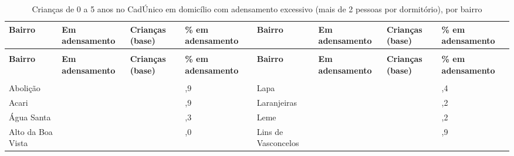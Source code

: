 \begin{apendicesenv}
{\renewcommand{\arraystretch}{1.0}
{\footnotesize\setlength{\tabcolsep}{3.5pt}
\begin{longtable}{@{}>{\raggedright\arraybackslash}p{2.95cm}>{\raggedleft\arraybackslash}p{1.25cm}>{\raggedleft\arraybackslash}p{1.25cm}>{\raggedleft\arraybackslash}p{1.25cm}@{\hspace{0.6cm}}>{\raggedright\arraybackslash}p{2.95cm}>{\raggedleft\arraybackslash}p{1.25cm}>{\raggedleft\arraybackslash}p{1.25cm}>{\raggedleft\arraybackslash}p{1.25cm}@{}}
\caption{Crianças de 0 a 5 anos no CadÚnico em domicílio com adensamento excessivo (mais de 2 pessoas por dormitório), por bairro}\label{tab:tabela-mapa-cadunico-adensamento-bairro-2026}\\
\toprule \hyphenpenalty=10000\exhyphenpenalty=10000\textbf{Bairro} & \hyphenpenalty=10000\exhyphenpenalty=10000\textbf{Em adensamento} & \hyphenpenalty=10000\exhyphenpenalty=10000\textbf{Crianças (base)} & \hyphenpenalty=10000\exhyphenpenalty=10000\textbf{\% em adensamento} & \hyphenpenalty=10000\exhyphenpenalty=10000\textbf{Bairro} & \hyphenpenalty=10000\exhyphenpenalty=10000\textbf{Em adensamento} & \hyphenpenalty=10000\exhyphenpenalty=10000\textbf{Crianças (base)} & \hyphenpenalty=10000\exhyphenpenalty=10000\textbf{\% em adensamento} \\ \midrule \endfirsthead
\multicolumn{8}{@{}l}{\footnotesize\itshape (continuação)}\\ \toprule \hyphenpenalty=10000\exhyphenpenalty=10000\textbf{Bairro} & \hyphenpenalty=10000\exhyphenpenalty=10000\textbf{Em adensamento} & \hyphenpenalty=10000\exhyphenpenalty=10000\textbf{Crianças (base)} & \hyphenpenalty=10000\exhyphenpenalty=10000\textbf{\% em adensamento} & \hyphenpenalty=10000\exhyphenpenalty=10000\textbf{Bairro} & \hyphenpenalty=10000\exhyphenpenalty=10000\textbf{Em adensamento} & \hyphenpenalty=10000\exhyphenpenalty=10000\textbf{Crianças (base)} & \hyphenpenalty=10000\exhyphenpenalty=10000\textbf{\% em adensamento} \\ \midrule \endhead
\midrule \multicolumn{8}{r@{}}{\footnotesize\itshape (continua)}\\ \endfoot
\bottomrule \endlastfoot
Abolição & 62 & 183 & 33,9 & Lapa & 46 & 83 & 55,4 \\
Acari & 916 & 1.638 & 55,9 & Laranjeiras & 59 & 111 & 53,2 \\
Água Santa & 69 & 163 & 42,3 & Leme & 76 & 172 & 44,2 \\
Alto da Boa Vista & 94 & 188 & 50,0 & Lins de Vasconcelos & 494 & 933 & 52,9 \\

\end{longtable}}}
\end{apendicesenv}
